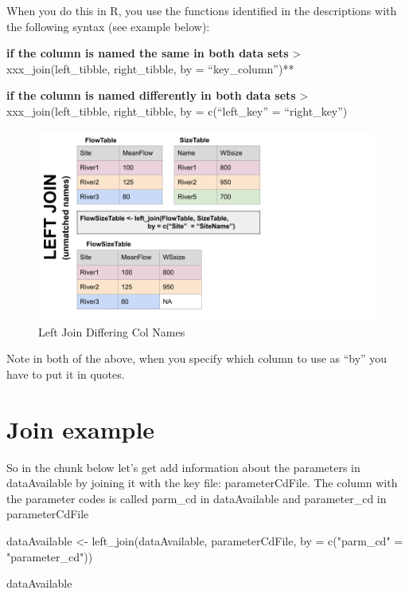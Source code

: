 \documentclass[
]{book}
\newenvironment{Shaded}{\begin{snugshade}}{\end{snugshade}}
\newcommand{\AttributeTok}[1]{\textcolor[rgb]{0.77,0.63,0.00}{#1}}
\newcommand{\FunctionTok}[1]{\textcolor[rgb]{0.00,0.00,0.00}{#1}}
\newcommand{\NormalTok}[1]{#1}
\newcommand{\OtherTok}[1]{\textcolor[rgb]{0.56,0.35,0.01}{#1}}
\newcommand{\StringTok}[1]{\textcolor[rgb]{0.31,0.60,0.02}{#1}}
\begin{document}
When you do this in R, you use the functions identified in the descriptions with the following syntax (see example below):

\textbf{if the column is named the same in both data sets}
\textgreater{} xxx\_join(left\_tibble, right\_tibble, by = ``key\_column'')**

\textbf{if the column is named differently in both data sets}
\textgreater{} xxx\_join(left\_tibble, right\_tibble, by = c(``left\_key'' = ``right\_key'')

\begin{figure}
\centering
\includegraphics{images/leftjoin2.png}
\caption{Left Join Differing Col Names}
\end{figure}

Note in both of the above, when you specify which column to use as ``by'' you have to put it in quotes.

\hypertarget{join-example}{%
\section{Join example}\label{join-example}}

So in the chunk below let's get add information about the parameters in dataAvailable by joining it with the key file: parameterCdFile. The column with the parameter codes is called parm\_cd in dataAvailable and parameter\_cd in parameterCdFile

\begin{Shaded}
\begin{Highlighting}[]
\NormalTok{dataAvailable }\OtherTok{\textless{}{-}} \FunctionTok{left\_join}\NormalTok{(dataAvailable, parameterCdFile, }\AttributeTok{by =} \FunctionTok{c}\NormalTok{(}\StringTok{"parm\_cd"} \OtherTok{=} \StringTok{"parameter\_cd"}\NormalTok{))}

\NormalTok{dataAvailable}
\end{Highlighting}
\end{Shaded}
\end{document}

